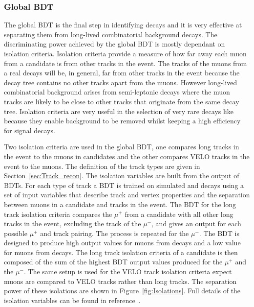 \subsubsection{Global BDT}
\label{sec:globalBDT}

The global BDT is the final step in identifying \bmumu decays and it is very effective at separating them from long-lived combinatorial background decays. The discriminating power achieved by the global BDT is mostly dependant on isolation criteria. Isolation criteria provide a measure of how far away each muon from a \bmumu candidate is from other tracks in the event. The tracks of the muons from a real \bmumu decays will be, in general, far from other tracks in the event because the \bmumu decay tree contains no other tracks apart from the muons. However long-lived combinatorial background arises from semi-leptonic decays where the muon tracks are likely to be close to other tracks that originate from the same decay tree. %
Isolation criteria are very useful in the selection of very rare decays like \bsmumu because they enable background to be removed whilst keeping a high efficiency for signal decays.

Two isolation criteria are used in the global BDT, one compares long tracks in the event to the muons in \bmumu candidates and the other compares VELO tracks in the event to the muons. The definition of the track types are given in Section~\ref{sec:Track_recon}. The isolation variables are built from the output of BDTs. For each type of track a BDT is trained on simulated \bsmumu and \bbbarmumux decays using a set of input variables that describe track and vertex properties and the separation between muons in a \bmumu candidate and tracks in the event. 
The BDT for the long track isolation criteria compares the $\mu^{+}$ from a \bsmumu candidate with all other long tracks in the event, excluding the track of the $\mu^{-}$, and gives an output for each possible $\mu^{+}$ and track pairing. The process is repeated for the $\mu^{-}$. The BDT is designed to produce high output values for muons from \bbbarmumux decays and a low value for muons from \bsmumu decays. The long track isolation criteria of a \bsmumu candidate is then composed of the sum of the highest BDT output values produced for the $\mu^{+}$ and the $\mu^{-}$. The same setup is used for the VELO track isolation criteria expect muons are compared to VELO tracks rather than long tracks. The separation power of these isolations are shown in Figure~\ref{fig:Isolations}. Full details of the isolation variables can be found in reference~\cite{Archilli:1970886}.


